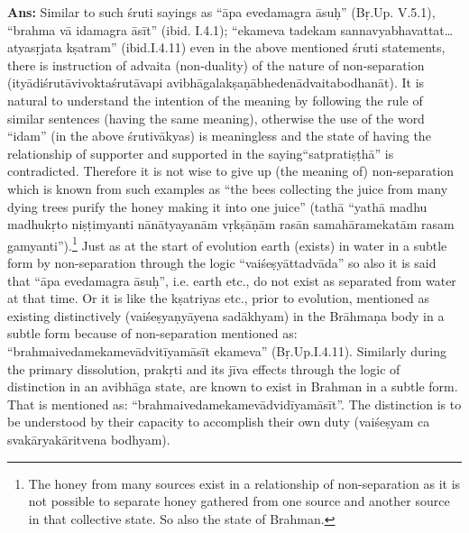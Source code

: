\textbf{Ans:} Similar to such śruti sayings as “āpa evedamagra āsuḥ” (Bṛ.Up. V.5.1), “brahma vā idamagra āsīt” (ibid. I.4.1); “ekameva tadekam sannavyabhavattat…atyasṛjata kṣatram” (ibid.I.4.11) even in the above mentioned śruti statements, there is instruction of advaita (non-duality) of the nature of non-separation (ityādiśrutāvivoktaśrutāvapi avibhāgalakṣaṇābhedenādvaitabodhanāt). It is natural to understand the intention of the meaning by following the rule of similar sentences (having the same meaning), otherwise the use of the word “idam” (in the above śrutivākyas) is meaningless and the state of having the relationship of supporter and supported in the saying“satpratiṣṭhā” is contradicted. Therefore it is not wise to give up (the meaning of) non-separation which is known from such examples as “the bees collecting the juice from many dying trees purify the honey making it into one juice” (tathā “yathā madhu madhukṛto niṣṭimyanti nānātyayanām vṛkṣāṇām rasān samahāramekatām rasam gamyanti”).\footnote{The honey from many sources exist in a relationship of non-separation as it is not possible to separate honey gathered from one source and another source in that collective state. So also the state of Brahman.} Just as at the start of evolution earth (exists) in water in a subtle form by non-separation through the logic “vaiśeṣyāttadvāda” so also it is said that “āpa evedamagra āsuḥ”, i.e. earth etc., do not exist as separated from water at that time. Or it is like the kṣatriyas etc., prior to evolution, mentioned as existing distinctively (vaiśeṣyaṇyāyena sadākhyam) in the Brāhmaṇa body in a subtle form because of non-separation mentioned as: “brahmaivedamekamevādvitīyamāsīt ekameva” (Bṛ.Up.I.4.11). Similarly during the primary dissolution, prakṛti and its jīva effects through the logic of distinction in an avibhāga state, are known to exist in Brahman in a subtle form. That is mentioned as: “brahmaivedamekamevādvidīyamāsīt”. The distinction is to be understood by their capacity to accomplish their own duty (vaiśeṣyam ca svakāryakāritvena bodhyam). 


